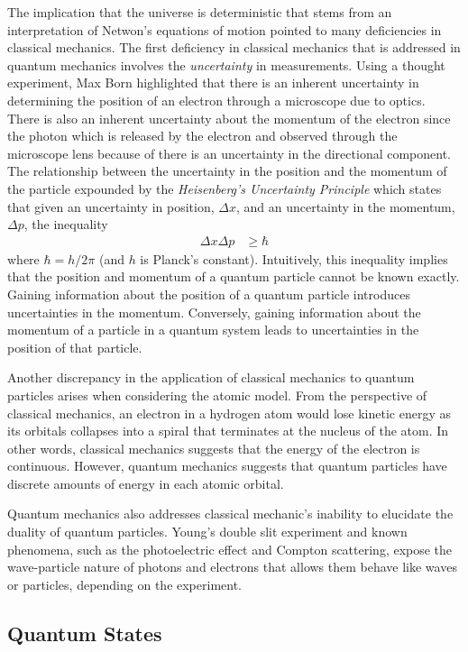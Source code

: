The implication that the universe is deterministic that stems from an interpretation of Netwon's equations of motion pointed to many deficiencies in classical mechanics. The first deficiency in classical mechanics that is addressed in quantum mechanics involves the \textit{uncertainty} in measurements. Using a thought experiment, Max Born highlighted that there is an inherent uncertainty in determining the position of an electron through a microscope due to optics. There is also an inherent uncertainty about the momentum of the electron since the photon which is released by the electron and observed through the microscope lens because of there is an uncertainty in the directional component. The relationship between the uncertainty in the position and the momentum of the particle expounded by the \textit{Heisenberg's Uncertainty Principle} which states that given an uncertainty in position, $\Delta x$, and an uncertainty in the momentum, $\Delta p$, the inequality
\begin{align}
	\Delta x \Delta p & \geq \hbar
\end{align}
where $\hbar = h/2\pi$ (and $h$ is Planck's constant). Intuitively, this inequality implies that the position and momentum of a quantum particle cannot be known exactly. Gaining information about the position of a quantum particle introduces uncertainties in the momentum. Conversely, gaining information about the momentum of a particle in a quantum system leads to uncertainties in the position of that particle.

Another discrepancy in the application of classical mechanics to quantum particles arises when considering the atomic model. From the perspective of classical mechanics, an electron in a hydrogen atom would lose kinetic energy as its orbitals collapses into a spiral that terminates at the nucleus of the atom. In other words, classical mechanics suggests that the energy of the electron is continuous. However, quantum mechanics suggests that quantum particles have discrete amounts of energy in each atomic orbital. 

Quantum mechanics also addresses classical mechanic's inability to elucidate the duality of quantum particles. Young's double slit experiment and known phenomena, such as the photoelectric effect and Compton scattering, expose the wave-particle nature of photons and electrons that allows them behave like waves or particles, depending on the experiment. 

\subsection{Quantum States \label{subsec:q-states}}


